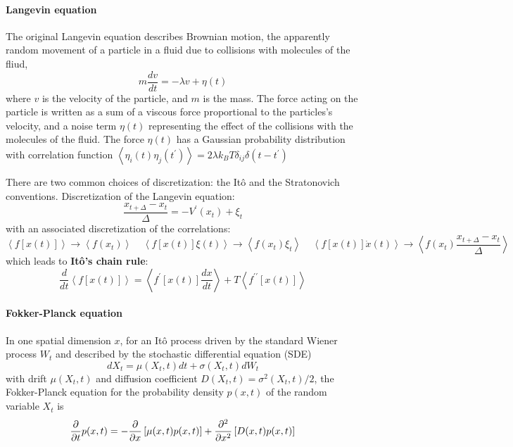\documentclass[books,12pt]{elegantpaper}
\newcommand{\fives}{\ \ \ \ \ }
\newcommand{\pder}[2][]{\frac{\partial#1}{\partial#2}}
\newcommand{\parag}{\paragraph}
\newcommand{\llang}{\left\langle}
\newcommand{\rrang}{\right\rangle}
\begin{document}
\parag{Langevin equation} %

The original Langevin equation describes Brownian motion, the apparently random movement of a particle in a fluid due to collisions with molecules of the fliud, 
$$ m \frac{dv}{dt} = - \lambda v + \eta(t) $$
where $v$ is the velocity of the particle, and $m$ is the mass. The force acting on the particle is written as a sum of a viscous force proportional to the particles's velocity, and a noise term $\eta(t)$ representing the effect of the collisions with the molecules of the fluid. The force $\eta(t)$ has a Gaussian probability distribution with correlation function $ \llang \eta_i(t) \eta_j(t^\prime) \rrang = 2 \lambda k_B T \delta_{ij} \delta(t-t^\prime)$

There are two common choices of discretization: the Itô and the Stratonovich conventions. Discretization of the Langevin equation:
$$ \frac{x_{t+\Delta} - x_t}{\Delta} = -V^\prime(x_t) + \xi_t $$
with an associated discretization of the correlations:
$$ \llang f\left[x(t)\right] \rrang \to \llang f(x_t) \rrang \fives \llang f\left[x(t)\right] \xi(t) \rrang \to \llang f(x_t)\xi_t \rrang \fives \llang f\left[x(t)\right] \dot{x}(t) \rrang \to \llang f(x_t) \frac{x_{t+\Delta} - x_t}{\Delta} \rrang $$
which leads to \textbf{Itô's chain rule}:
$$ \frac{d}{dt} \llang f\left[x(t)\right] \rrang = \llang f^\prime\left[x(t)\right] \frac{dx}{dt} \rrang + T \llang f^{\prime\prime} \left[ x(t) \right] \rrang $$


\parag{Fokker-Planck equation} In one spatial dimension $x$, for an Itô process driven by the standard Wiener process $W_t$ and described by the stochastic differential equation (SDE)
$$ dX_t = \mu(X_t,t) dt + \sigma(X_t,t) dW_t $$
with drift $\mu(X_t,t)$ and diffusion coefficient $D(X_t,t) = \sigma^2(X_t,t)/2$, the Fokker-Planck equation for the probability density $p(x,t)$ of the random variable $X_t$ is
$$ \pder{t} p(x,t) = - \pder{x} \left[ \mu(x,t) p(x,t) \right] + \pdv[2]{}{x} \left[ D(x,t) p(x,t) \right] $$
\end{document}
